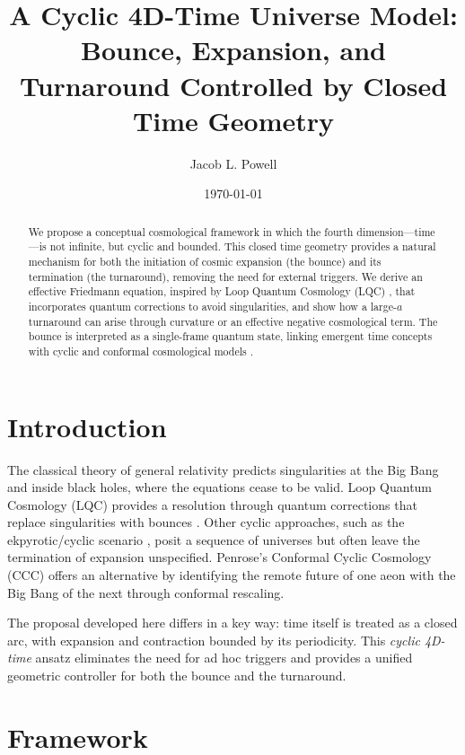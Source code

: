 \documentclass[12pt]{article}
\title{A Cyclic 4D-Time Universe Model: Bounce, Expansion, and Turnaround Controlled by Closed Time Geometry}
\author{Jacob L. Powell}
\date{\today}
\begin{document}
\maketitle

\begin{abstract}
We propose a conceptual cosmological framework in which the fourth dimension---time---is 
not infinite, but cyclic and bounded. This closed time geometry provides a natural mechanism 
for both the initiation of cosmic expansion (the bounce) and its termination (the turnaround), 
removing the need for external triggers. We derive an effective Friedmann equation, inspired by 
Loop Quantum Cosmology (LQC) \cite{Ashtekar2006,Bojowald2001}, that incorporates quantum 
corrections to avoid singularities, and show how a large-$a$ turnaround can arise through curvature 
or an effective negative cosmological term. The bounce is interpreted as a single-frame quantum 
state, linking emergent time concepts \cite{Hartle1983,Rovelli2017} with cyclic and conformal 
cosmological models \cite{Steinhardt2002,Penrose2010}.
\end{abstract}

\section{Introduction}
The classical theory of general relativity predicts singularities at the Big Bang and inside 
black holes, where the equations cease to be valid. Loop Quantum Cosmology (LQC) provides 
a resolution through quantum corrections that replace singularities with bounces 
\cite{Ashtekar2006,Bojowald2001}. Other cyclic approaches, such as the ekpyrotic/cyclic 
scenario \cite{Steinhardt2002}, posit a sequence of universes but often leave the termination 
of expansion unspecified. Penrose's Conformal Cyclic Cosmology (CCC) \cite{Penrose2010} 
offers an alternative by identifying the remote future of one aeon with the Big Bang of the 
next through conformal rescaling. 

The proposal developed here differs in a key way: time itself is treated as a closed arc, 
with expansion and contraction bounded by its periodicity. This \emph{cyclic 4D-time} ansatz 
eliminates the need for ad hoc triggers and provides a unified geometric controller for both 
the bounce and the turnaround.

\section{Framework}
\end{document}
